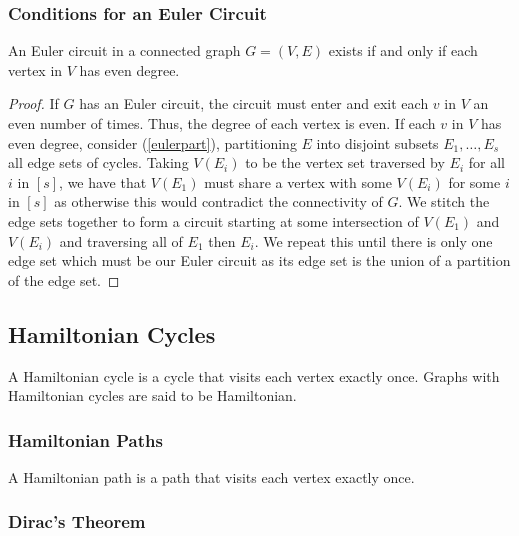 \subsubsection{Conditions for an Euler Circuit}

An Euler circuit in a connected graph $G = (V, E)$ exists if and only 
if each vertex in $V$ has even degree.
\begin{proof}
    If $G$ has an Euler circuit, the circuit must enter and exit each $v$
    in $V$ an even number of times. Thus, the degree of each vertex is even.
    If each $v$ in $V$ has even degree, consider (\ref{eulerpart}), partitioning
    $E$ into disjoint subsets $E_1, \ldots, E_s$ all edge sets of cycles.
    Taking $V(E_i)$ to be the vertex set traversed by $E_i$ for all $i$ in $[s]$,
    we have that $V(E_1)$ must share a vertex with some $V(E_i)$ for some $i$ in $[s]$
    as otherwise this would contradict the connectivity of $G$.
    We stitch the edge sets together to form a circuit starting at some
    intersection of $V(E_1)$ and $V(E_i)$ and traversing all of
    $E_1$ then $E_i$. We repeat this until there is only one edge set
    which must be our Euler circuit as its edge set is the union of a
    partition of the edge set.
\end{proof}

\subsection{Hamiltonian Cycles}

A Hamiltonian cycle is a cycle that visits each vertex exactly once.
Graphs with Hamiltonian cycles are said to be Hamiltonian.

\subsubsection{Hamiltonian Paths}

A Hamiltonian path is a path that visits each vertex exactly once.

\newpage

\subsubsection{Dirac's Theorem}

